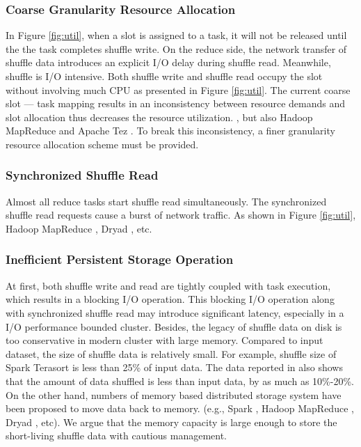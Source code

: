 \subsubsection{Coarse Granularity Resource Allocation}
In Figure \ref{fig:util}, when a slot is assigned to a task, it will not be released until the the task completes shuffle write. 
On the reduce side, the network transfer of shuffle data introduces an explicit I/O delay during shuffle read. 
Meanwhile, shuffle is I/O intensive. 
Both shuffle write and shuffle read occupy the slot without involving much CPU as presented in Figure \ref{fig:util}. 
The current coarse slot --- task mapping results in an inconsistency between resource demands and slot allocation thus decreases the resource utilization. 
 \cite{apachespark}, but also Hadoop MapReduce \cite{hadoop} and Apache Tez \cite{tez}. 
To break this inconsistency, a finer granularity resource allocation scheme must be provided.

\subsubsection{Synchronized Shuffle Read}
Almost all reduce tasks start shuffle read simultaneously. 
The synchronized shuffle read requests cause a burst of network traffic. 
As shown in Figure \ref{fig:util}, 
 Hadoop MapReduce \cite{hadoop}, Dryad \cite{dryad}, etc.

\subsubsection{Inefficient Persistent Storage Operation}
At first, both shuffle write and read are tightly coupled with task execution, which results in a blocking I/O operation. 
This blocking I/O operation along with synchronized shuffle read may introduce significant latency, especially in a I/O performance bounded cluster.
Besides, the legacy of  shuffle data on disk is too conservative in modern cluster with large memory. 
Compared to input dataset, the size of shuffle data is relatively small. 
For example, shuffle size of Spark Terasort \cite{spark-tera} is less than 25\% of input data. 
The data reported in \cite{makingsense} also shows that the amount of data shuffled is less than input data, by as much as 10\%-20\%. 
On the other hand, numbers of memory based distributed storage system have been proposed \cite{memcached, tachyon, ramcloud} to move data back to memory. 
\ifrevision
{}
\fi
{}(e.g., Spark \cite{apachespark}, Hadoop MapReduce \cite{hadoop}, Dryad \cite{dryad}, etc).
We argue that the memory capacity is large enough to store the short-living shuffle data with cautious management.

